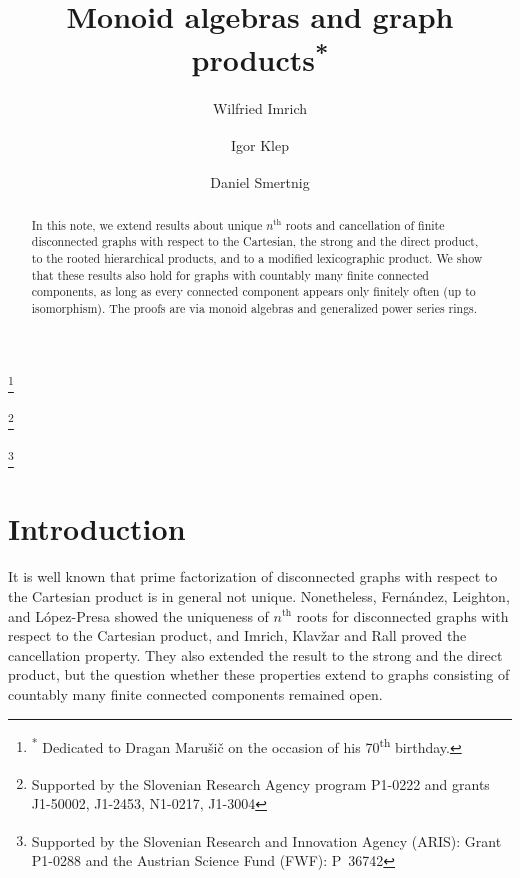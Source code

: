 \documentclass{amsart}
\theoremstyle{plain}
\theoremstyle{definition}
\begin{document}
\title{Monoid algebras and graph products\textsuperscript{*}}
\thanks{\textsuperscript{*} Dedicated to Dragan Maru\v{s}i\v{c} on the occasion of his 70\textsuperscript{th} birthday.}


\author{Wilfried Imrich}
\address{Montanuniversit\"{a}t Leoben, Leoben, Austria}

\author{Igor Klep\textsuperscript{\textdagger}}
\address{Faculty of Mathematics and Physics (FMF),
University of Ljubljana and
Fakulteta za matematiko, naravoslovje
in informacijske tehnologije (FAMNIT), University of Primorska, Koper
and Institute of Mathematics, Physics and Mechanics (IMFM),
Ljubljana, Slovenia}
\thanks{\textsuperscript{\textdagger} Supported by the Slovenian Research Agency program P1-0222 and grants J1-50002, J1-2453, N1-0217, J1-3004}

\author{Daniel Smertnig\textsuperscript{\ddag}}
\address{Faculty of Mathematics and Physics (FMF),
University of Ljubljana
and Institute of Mathematics, Physics and Mechanics (IMFM),
Ljubljana, Slovenia}
\thanks{\textsuperscript{\ddag} Supported by the Slovenian Research and Innovation Agency (ARIS): Grant P1-0288 and the Austrian Science Fund (FWF): P~36742}


\begin{abstract}
In this note, we extend results about unique $n^{\textrm{th}}$ roots and cancellation of finite disconnected graphs with respect to the Cartesian, the strong and the direct product, to the rooted hierarchical products, and to a modified lexicographic product. We show that these results also hold for graphs with countably many finite connected components, as long as every connected component appears only finitely often (up to isomorphism).
The proofs are via monoid algebras and generalized power series rings.
\end{abstract}

\maketitle

\section{Introduction}
It is well known that prime factorization of disconnected graphs with respect to the Cartesian product is in general not unique. Nonetheless,   Fern\'andez, Leighton, and
L\'opez-Presa  \cite{fele07} showed the uniqueness of $n^{\textrm{th}}$ roots for
disconnected graphs with respect to the Cartesian product, and  Imrich, Klav\v{z}ar and Rall \cite{imkl07} proved the cancellation property. They also extended the result to the strong and the direct product, but the question whether these properties extend to graphs consisting of countably many finite connected components remained open.
\end{document}
